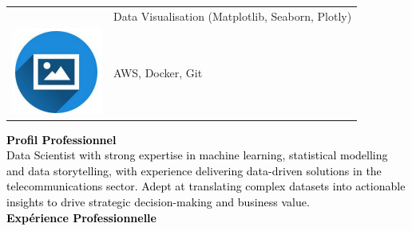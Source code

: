 \documentclass{article}
\begin{document}
\begin{paracol}{2}
\begin{tabular}{ll}
\begin{minipage}{0.1\linewidth}
         \end{minipage} & Data Visualisation (Matplotlib, Seaborn, Plotly) \\[10pt]
         \begin{minipage}{0.1\linewidth}
         \includegraphics[width=\linewidth]{picon.png}
         \end{minipage} & AWS, Docker, Git \\[10pt]
        \end{tabular}
        
\switchcolumn
\color{black}

\textcolor{black}{\Large \textbf{Profil Professionnel}} \\

\textcolor{black}{Data Scientist with strong expertise in machine learning, statistical modelling and data storytelling, with experience delivering data-driven solutions in the telecommunications sector. Adept at translating complex datasets into actionable insights to drive strategic decision-making and business value.}\\[8pt]

\textcolor{black}{\Large \textbf{Expérience Professionnelle}} \\


\end{paracol}
\end{document}
